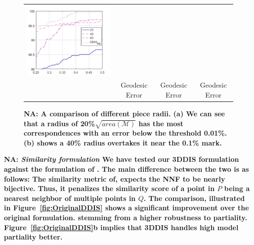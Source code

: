 \documentclass[10pt,twocolumn,letterpaper]{article}
\newcommand{\colornote}[3]{{\color{#1}\bf{#2: #3}\normalfont}}
\newcommand{\colornote}[3]{}
\newcommand {\nadav}[1]{\colornote{red}{NA}{#1}}
\begin{document}
{\begin{figure}[htb]
\begin{tabular}{cccc}
		\includegraphics[scale=0.5]{figures/PieceSizeHigh.png}
		\\
		& Geodesic Error &  Geodesic Error &  Geodesic Error\\
	\end{tabular}
	\caption{\nadav{{\bf A comparison of different piece radii}. (a) We can see that a radius of 20\%$\sqrt{area(\mathcal{M})}$ has the most correspondences with an error below the threshold 0.01\%.(b) shows a 40\% radius overtakes it near the 0.1\% mark.}} 
		\label{fig:DifferentRadii}
\end{figure}
}

\nadav{
	\textit{Similarity formulation}	We have tested our 3DDIS formulation against the formulation of \cite{talmi2017template}. 
	The main difference between the two is as follows:
	The similarity metric of\cite{talmi2017template}, expects the NNF to be nearly bijective.
	Thus, it penalizes the similarity score of a point in $P$ being a nearest neighbor of multiple points in $Q$. 
	The comparison, illustrated in Figure~\ref{fig:OriginalDDIS} shows a significant improvement over the original formulation. stemming from a higher robustness to partiality. Figure~\ref{fig:OriginalDDIS}b implies that 3DDIS handles high model partiality better.}
\end{document}
